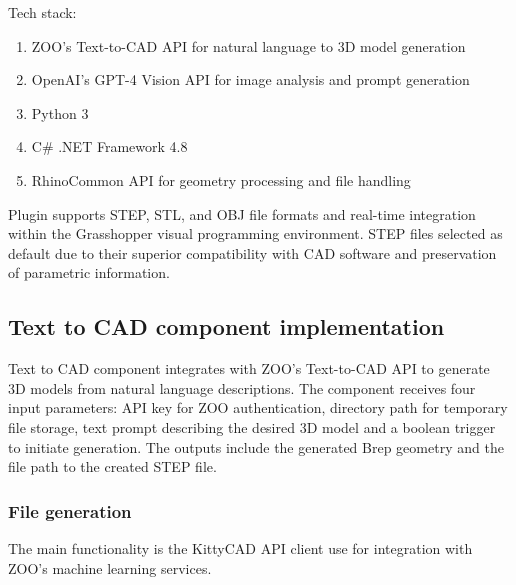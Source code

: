 \vspace{0.5cm}

Tech stack:
\begin{enumerate}
\item ZOO's Text-to-CAD API for natural language to 3D model generation
\item OpenAI's GPT-4 Vision API for image analysis and prompt generation
\item Python 3
\item C\# .NET Framework 4.8 
\item RhinoCommon API for geometry processing and file handling
\end{enumerate}

\vspace{0.5cm}

Plugin supports STEP, STL, and OBJ file formats and real-time integration within the Grasshopper visual programming environment. STEP files selected as default due to their superior compatibility with CAD software and preservation of parametric information.

\subsection{Text to CAD component implementation}

Text to CAD component integrates with ZOO's Text-to-CAD API to generate 3D models from natural language descriptions. The component receives four input parameters: API key for ZOO authentication, directory path for temporary file storage, text prompt describing the desired 3D model and a boolean trigger to initiate generation. The outputs include the generated Brep geometry and the file path to the created STEP file.

\subsubsection{File generation}

The main functionality is the KittyCAD API client use for integration with ZOO's machine learning services. 
 
